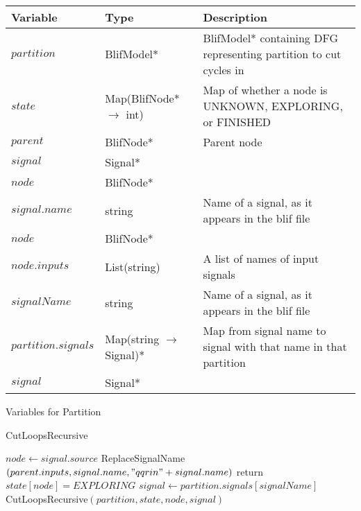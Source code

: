 \documentclass[12pt,draft,oneside]{article} %
\begin{document}
\begin{algorithm}
    \begin{center}
        \begin{tabularx}{\linewidth}{llX}
        \toprule
        Variable & Type & Description\\
        \midrule
        $partition$ & BlifModel* & BlifModel* containing DFG representing partition to cut cycles in\\
        $state$ & Map(BlifNode* $\to$ int) & Map of whether a node is UNKNOWN, EXPLORING, or FINISHED\\
        $parent$ &BlifNode* & Parent node \\
        $signal$ & Signal* & \\
        $node$ &BlifNode* &\\
        $signal.name$ & string & Name of a signal, as it appears in the blif file\\
        $node$ &BlifNode* &\\
        $node.inputs$ &List(string) & A list of names of input signals\\
        $signalName$ & string & Name of a signal, as it appears in the blif file\\
        $partition.signals$ & Map(string $\to$ Signal)* & Map from signal name to signal with that name in that partition \\
        $signal$ & Signal* & \\
        \bottomrule
        \end{tabularx}
        \caption{Variables for Partition}
        \label{varPart}
    \end{center}
   \caption{CutLoopsRecursive}\label{main}
   \begin{algorithmic}[1]
            \State $node \gets signal.source$
               \State ReplaceSignalName$(parent.inputs, signal.name, "qqrin"+signal.name)$
             
               \State return
            \Else{}
               \State $state[node] = EXPLORING$
                  \State $signal \gets partition.signals[signalName]$
                  \State CutLoopsRecursive$(partition, state, node, signal)$
               \EndFor
            \EndIf
         \EndProcedure
   \end{algorithmic}
\end{algorithm}
\end{document}
